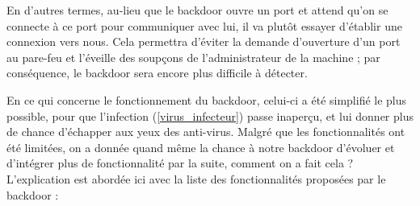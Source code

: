         En d'autres termes, au-lieu que le backdoor ouvre un port et attend qu'on se connecte à ce port pour 
        communiquer avec lui, il va plutôt essayer d'établir une connexion vers nous. Cela permettra d'éviter la demande
        d'ouverture d'un port au pare-feu et l'éveille des soupçons de l'administrateur de la machine ; 
        par conséquence, le backdoor sera encore plus difficile à détecter.

        En ce qui concerne le fonctionnement du backdoor, celui-ci a été simplifié le plus possible, pour que 
        l'infection (\autoref{virus_infecteur}) passe inaperçu, et lui donner plus de chance d'échapper aux yeux des anti-virus. 
        Malgré que les fonctionnalités ont été limitées, on a donnée quand même la chance à notre backdoor 
        d'évoluer et d’intégrer plus de fonctionnalité par la suite, comment on a fait cela ? 
        L'explication est abordée ici avec la liste des fonctionnalités proposées par le backdoor : %

